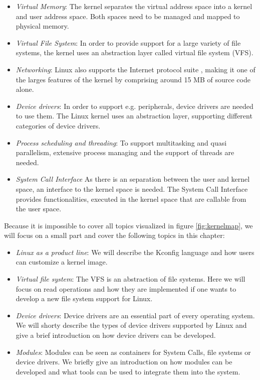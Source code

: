 \documentclass{sig-alternate-05-2015}
\begin{document}
\begin{itemize}
\item \emph{Virtual Memory}: The kernel separates the virtual address space into a kernel and user address space. Both spaces need to be managed and mapped to physical memory.
\item \emph{Virtual File System}: In order to provide support for a large variety of file systems, the kernel uses an abstraction layer called virtual file system (VFS).
\item \emph{Networking}: Linux also supports the  Internet protocol suite \cite{almquist1992type}, making it one of the larges features of the kernel by comprising around 15 MB of source code alone.
\item \emph{Device drivers}: In order to  support e.g. peripherals, device drivers are needed to use them. The Linux kernel uses an abstraction layer, supporting different categories of device drivers.
\item \emph{Process scheduling and threading}: To support multitasking and quasi parallelism, extensive process managing and the support of threads are needed.
\item \emph{System Call Interface} As there is an separation between the user and kernel space, an interface to the kernel space is needed. The System Call Interface provides functionalities, executed in the kernel space that are callable from the user space.
\end{itemize}


Because it is impossible to cover all topics visualized in figure \ref{fig:kernelmap}, we will focus on a small part and cover the following topics in this chapter:
\begin{itemize}
\item \emph{Linux as a product line}: We will describe the Kconfig language and how users can customize a kernel image.
\item \emph{Virtual file system}: The VFS is an abstraction of file systems. Here we will focus on read operations and how they are implemented if one wants to develop a new file system support for Linux.
\item \emph{Device drivers}: Device drivers are an essential part of every operating system. We will shorty describe the types of device drivers supported by Linux and give a brief introduction on how device drivers can be developed.
\item \emph{Modules}: Modules can be seen as containers for System Calls, file systems or device drivers. We briefly give an introduction on how modules can be developed and what tools can be used to integrate them into the system.
\end{itemize}
\end{document}
